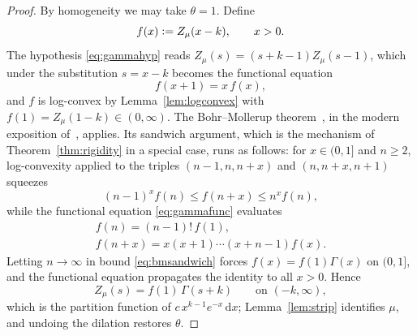 \documentclass[sn-mathphys-num]{sn-jnl}
\theoremstyle{thmstyleone}%
\theoremstyle{thmstyletwo}%
\theoremstyle{thmstylethree}%
\theoremstyle{thmstyleone}%
\providecommand{\dd}{\,\mathrm{d}}
\providecommand{\eqdef}{\mathrel{\vcentcolon=}}
\begin{document}
\begin{appendices}
		\thmgammachar*
		
		\begin{proof}
			By homogeneity we may take $\theta=1$. Define
			\begin{equation}\label{eq:fdef}
				f(x)\eqdef Z_\mu(x-k),\qquad x>0 .
			\end{equation}
			The hypothesis \eqref{eq:gammahyp} reads
			$Z_\mu(s)=(s+k-1)Z_\mu(s-1)$, which under the substitution
			$s=x-k$ becomes the functional equation
			\begin{equation}\label{eq:gammafunc}
				f(x+1)=x\,f(x),
			\end{equation}
			and $f$ is log-convex by Lemma~\ref{lem:logconvex} with
			$f(1)=Z_\mu(1-k)\in(0,\infty)$. The Bohr--Mollerup
			theorem~\cite{bohr1922}, in the modern exposition
			of~\cite{artin1964}, applies. Its sandwich argument, which is
			the mechanism of Theorem~\ref{thm:rigidity} in a special case,
			runs as follows: for
			$x\in(0,1]$ and $n\ge2$, log-convexity applied to the triples
			$(n-1,n,n+x)$ and $(n,n+x,n+1)$ squeezes
			\begin{equation}\label{eq:bmsandwich}
				(n-1)^{x}f(n)\le f(n+x)\le n^{x}f(n),
			\end{equation}
			while the functional equation \eqref{eq:gammafunc} evaluates
			\begin{equation}\label{eq:bmeval}
				\begin{gathered}
					f(n)=(n-1)!\,f(1),\\
					f(n+x)=x(x+1)\cdots(x+n-1)f(x).
				\end{gathered}
			\end{equation}
			Letting $n\to\infty$ in bound \eqref{eq:bmsandwich} forces
			$f(x)=f(1)\Gamma(x)$ on $(0,1]$, and the functional equation
			propagates the identity to all $x>0$. Hence
			\begin{equation}\label{eq:gammaZ}
				Z_\mu(s)=f(1)\,\Gamma(s+k)\qquad\text{on }(-k,\infty),
			\end{equation}
			which is the partition function of $c\,x^{k-1}e^{-x}\dd x$;
			Lemma~\ref{lem:strip} identifies $\mu$, and undoing the dilation
			restores $\theta$.
		\end{proof}
		
		\thmlognormalchar*
		

\end{appendices}
\end{document}
